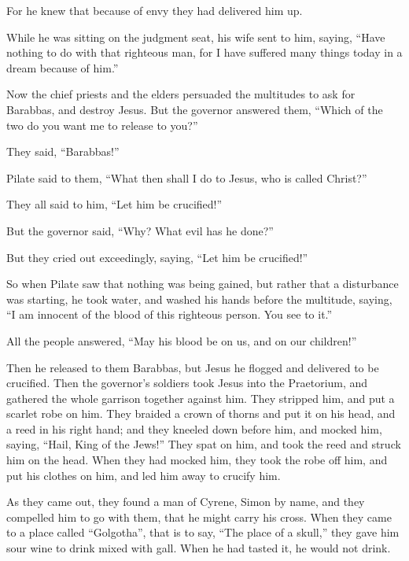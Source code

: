 {For he knew that because of envy they had delivered him up.
\par }{\PP {}While he was sitting on the judgment seat, his wife sent to him, saying, “Have nothing to do with that righteous man, for I have suffered many things today in a dream because of him.”
\par }{\PP {}Now the chief priests and the elders persuaded the multitudes to ask for Barabbas, and destroy Jesus.
But the governor answered them, “Which of the two do you want me to release to you?”
\par }{\PP They said, “Barabbas!”
\par }{\PP {}Pilate said to them, “What then shall I do to Jesus, who is called Christ?”
\par }{\PP They all said to him, “Let him be crucified!”
\par }{\PP {}But the governor said, “Why? What evil has he done?”
\par }{\PP But they cried out exceedingly, saying, “Let him be crucified!”
\par }{\PP {}So when Pilate saw that nothing was being gained, but rather that a disturbance was starting, he took water, and washed his hands before the multitude, saying, “I am innocent of the blood of this righteous person. You see to it.”
\par }{\PP {}All the people answered, “May his blood be on us, and on our children!”
\par }{\PP {}Then he released to them Barabbas, but Jesus he flogged and delivered to be crucified.
Then the governor’s soldiers took Jesus into the Praetorium, and gathered the whole garrison together against him.
They stripped him, and put a scarlet robe on him.
They braided a crown of thorns and put it on his head, and a reed in his right hand; and they kneeled down before him, and mocked him, saying, “Hail, King of the Jews!”
They spat on him, and took the reed and struck him on the head.
When they had mocked him, they took the robe off him, and put his clothes on him, and led him away to crucify him.
\par }{\PP {}As they came out, they found a man of Cyrene, Simon by name, and they compelled him to go with them, that he might carry his cross.
When they came to a place called “Golgotha”, that is to say, “The place of a skull,”
they gave him sour wine to drink mixed with gall. When he had tasted it, he would not drink.
}
